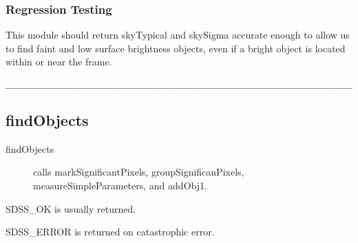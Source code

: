 \subsubsection {Regression Testing}

This module should return skyTypical and skySigma 
accurate enough to allow us to find faint and low surface brightness objects,
even if a bright object is located within or near the frame. 
 
\begin{verbatim}
__________________________________________________________________________
\end{verbatim}

\subsection{findObjects}

\begin{description}
\item[findObjects] calls markSignificantPixels, groupSignificanPixels,
measureSimpleParameters, and addObj1.
\end{description}

\begin{description}
\item{\quad SDSS\_OK} is usually returned.
\item{\quad SDSS\_ERROR} is returned on catastrophic error.
\end{description}

